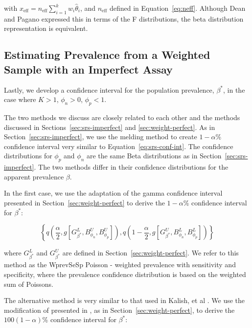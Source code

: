 \documentclass[AMA,STIX1COL]{WileyNJD-v2}
\begin{document}
with \( x_{\text{eff}} = n_{\text{eff}} \sum_{i=1}^k w_i \hat{\theta}_i \), and \( n_{\text{eff}} \) defined in Equation~\ref{eq:neff}.
Although Dean and Pagano \cite{Dean:2015} expressed this in terms of the F distributions, the beta distribution representation is equivalent.

\subsection{Estimating Prevalence from a Weighted Sample with an Imperfect Assay}
\label{sec:weight-imperfect}

Lastly, we develop a confidence interval for the population prevalence, \( \beta^* \), in the case where \( K > 1 \), \( \phi_n > 0 \), \( \phi_p < 1 \).

The two methods we discuss are closely related to each other and the methods discussed in Sections~\ref{sec:srs-imperfect} and \ref{sec:weight-perfect}.
As in Section~\ref{sec:srs-imperfect}, we use the melding method \cite{FayP:2015} to create \( 1 - \alpha \)\% confidence interval very similar to Equation~\ref{eq:srs-conf-int}.
The confidence distributions for \( \phi_p \) and \( \phi_n \) are the same Beta distributions as in Section~\ref{sec:srs-imperfect}.
The two methods differ in their confidence distributions for the apparent prevalence \( \beta \).

In the first case, we use the adaptation of the gamma confidence interval \cite{FayF:1997} presented in Section~\ref{sec:weight-perfect} to derive the \( 1 - \alpha \)\% confidence interval for \( \beta^* \):

\begin{equation}
    \left\{ q \left( \frac{\alpha}{2}, %
    g \left[ G^L_{\beta^*}, B^U_{\phi_n}, B^U_{\phi_p} \right]
    \right),  q \left( 1 - \frac{\alpha}{2}, %
       g \left[G^U_{\beta^*}, B^L_{\phi_n}, B^L_{\phi_p} \right] \right)
       \right\}
\end{equation}

where  \( G_{\beta^*}^L \) and \( G_{\beta^*}^U \) are defined in Section~\ref{sec:weight-perfect}.
We refer to this method as the WprevSeSp Poisson - weighted prevalence with sensitivity and specificity, where the prevalence confidence distribution is based on the weighted sum of Poissons.

The alternative method is very similar to that used in Kalish, et al \cite{Kali:2021}.
We use the  modification of \cite{Korn:1998} presented in \cite{Dean:2015}, as in Section~\ref{sec:weight-perfect}, to derive the \( 100(1 - \alpha) \)\% confidence interval for \( \beta^* \):
\end{document}
